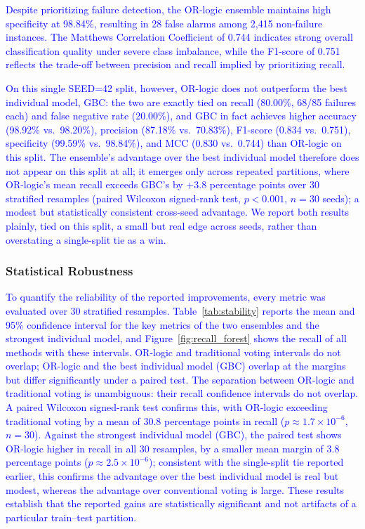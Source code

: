 \documentclass[final,5p, twocolumn]{elsarticle}
\begin{document}
\textcolor{blue}{Despite prioritizing failure detection, the OR-logic ensemble maintains high specificity at 98.84\%, resulting in 28 false alarms among 2,415 non-failure instances. The Matthews Correlation Coefficient of 0.744 indicates strong overall classification quality under severe class imbalance, while the F1-score of 0.751 reflects the trade-off between precision and recall implied by prioritizing recall.}

\textcolor{blue}{On this single SEED=42 split, however, OR-logic does not outperform the best individual model, GBC: the two are exactly tied on recall (80.00\%, 68/85 failures each) and false negative rate (20.00\%), and GBC in fact achieves higher accuracy (98.92\% vs.\ 98.20\%), precision (87.18\% vs.\ 70.83\%), F1-score (0.834 vs.\ 0.751), specificity (99.59\% vs.\ 98.84\%), and MCC (0.830 vs.\ 0.744) than OR-logic on this split. The ensemble's advantage over the best individual model therefore does not appear on this split at all; it emerges only across repeated partitions, where OR-logic's mean recall exceeds GBC's by +3.8 percentage points over 30 stratified resamples (paired Wilcoxon signed-rank test, $p<0.001$, $n=30$ seeds); a modest but statistically consistent cross-seed advantage. We report both results plainly, tied on this split, a small but real edge across seeds, rather than overstating a single-split tie as a win.}

\subsubsection{Statistical Robustness}
\textcolor{blue}{To quantify the reliability of the reported improvements, every metric was evaluated over 30 stratified resamples. Table~\ref{tab:stability} reports the mean and 95\% confidence interval for the key metrics of the two ensembles and the strongest individual model, and Figure~\ref{fig:recall_forest} shows the recall of all methods with these intervals. OR-logic and traditional voting intervals do not overlap; OR-logic and the best individual model (GBC) overlap at the margins but differ significantly under a paired test. The separation between OR-logic and traditional voting is unambiguous: their recall confidence intervals do not overlap. A paired Wilcoxon signed-rank test confirms this, with OR-logic exceeding traditional voting by a mean of 30.8 percentage points in recall ($p \approx 1.7\times10^{-6}$, $n=30$). Against the strongest individual model (GBC), the paired test shows OR-logic higher in recall in all 30 resamples, by a smaller mean margin of 3.8 percentage points ($p \approx 2.5\times10^{-6}$); consistent with the single-split tie reported earlier, this confirms the advantage over the best individual model is real but modest, whereas the advantage over conventional voting is large. These results establish that the reported gains are statistically significant and not artifacts of a particular train--test partition.}
\end{document}
